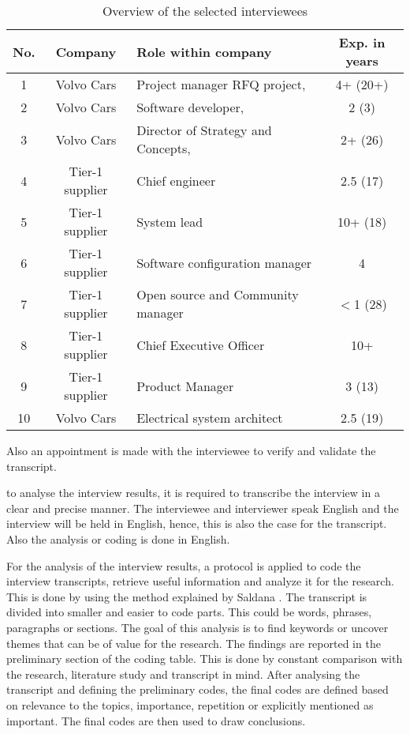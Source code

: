  \begin{table}[htb]
 \centering
 \begin{tabular}{|c|c|p{3.4cm}|c|}\hline
 {\bf No.} & {\bf Company} & {\bf Role within company} & {\bf Exp. in years}\\ \hline
 1 & Volvo Cars & Project manager RFQ project, & 4+ (20+) \\ \hline
 2 & Volvo Cars & Software developer, & 2 (3)\\ \hline
 3 & Volvo Cars & Director of Strategy and Concepts, & 2+ (26) \\ \hline
 4 & Tier-1 supplier & Chief engineer & 2.5 (17)\\ \hline
 5 & Tier-1 supplier & System lead & 10+ (18) \\ \hline
 6 & Tier-1 supplier & Software configuration manager & 4\\ \hline
 7 & Tier-1 supplier & Open source and Community manager & $<$1 (28)\\ \hline
 8 & Tier-1 supplier & Chief Executive Officer & 10+\\ \hline
 9 & Tier-1 supplier & Product Manager & 3 (13)\\ \hline
 10 & Volvo Cars & Electrical system architect & 2.5 (19)\\ \hline
 \end{tabular}
 \caption{Overview of the selected interviewees}
 \label{tab:population}
 \vspace{-.4cm}
 \end{table}

Also an appointment is made with the interviewee to verify and validate the transcript.

 to analyse the interview results, it is required to transcribe the interview in a clear and precise manner. The interviewee and interviewer speak English and the interview will be held in English, hence, this is also the case for the transcript. Also the analysis or coding is done in English.

 For the analysis of the interview results, a protocol is applied to code the interview transcripts, retrieve useful information and analyze it for the research. This is done by using the method explained by Saldana \cite{saldana2015coding}. The transcript is divided into smaller and easier to code parts. This could be words, phrases, paragraphs or sections. The goal of this analysis is to find keywords or uncover themes that can be of value for the research. The findings are reported in the preliminary section of the coding table. This is done by constant comparison with the research, literature study and transcript in mind. After analysing the transcript and defining the preliminary codes, the final codes are defined based on relevance to the topics, importance, repetition or explicitly mentioned as important. The final codes are then used to draw conclusions.

